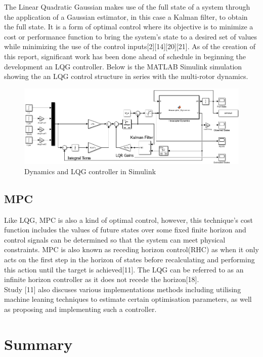 \documentclass[12pt,a4paper,twoside]{report}
\begin{document}
				The Linear Quadratic Gaussian makes use of the full state of a system through the application of a Gaussian estimator, in this case a Kalman filter, to obtain the full state. It is a form of optimal control where its objective is to minimize a cost or performance function to bring the system’s state to a desired set of values while minimizing the use of the control inputs[2][14][20][21]. As of the creation of this report, significant work has been done ahead of schedule in beginning the development an LQG controller. Below is the MATLAB Simulink simulation showing the an LQG control structure in series with the multi-rotor dynamics.
				
				\begin{figure}[h!]
					\includegraphics[width=\linewidth]{LQGsim.png}
					\caption{Dynamics and LQG controller in Simulink}
					\label{fig:LQGsim}
				\end{figure} 
			
			\subsection*{MPC}
				Like LQG, MPC is also a kind of optimal control, however, this technique's cost function includes the values of future states over some fixed finite horizon and control signals can be determined so that the system can meet physical constraints. MPC is also known as receding horizon control(RHC) as when it only acts on the first step in the horizon of states before recalculating and performing this action until the target is achieved[11]. The LQG can be referred to as an infinite horizon controller as it does not recede the horizon[18].
				\\
				Study [11] also discuses various implementations methods including utilising machine leaning techniques to estimate certain optimisation parameters, as well as proposing and implementing such a controller.
		
		\section*{Summary}
		
\end{document}
